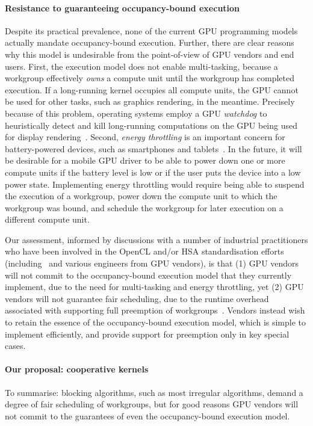 \documentclass[numbers,nocopyrightspace,10pt]{sigplanconf}
\begin{document}
\paragraph{Resistance to guaranteeing occupancy-bound execution}

Despite its practical prevalence, none of the current GPU programming
models actually mandate occupancy-bound execution.  Further, there are
clear reasons why this model is undesirable from the point-of-view of
GPU vendors and end users.  First, the execution model does not enable
multi-tasking, because a workgroup effectively \emph{owns} a compute
unit until the workgroup has completed execution.  If a long-running
kernel occupies all compute units, the GPU cannot be used for other
tasks, such as graphics rendering, in the meantime.  Precisely because
of this problem, operating systems employ a GPU \emph{watchdog} to
heuristically detect and kill long-running computations on the GPU
being used for display rendering~\cite{DBLP:conf/iwocl/SorensenD16}.  Second, \emph{energy throttling} is
an important concern for battery-powered devices, such as smartphones
and tablets~\cite{DBLP:journals/comsur/Vallina-RodriguezC13}.  In the future, it will be desirable for a mobile GPU driver to be able to
power down one or more compute units if the battery level is low or if
the user puts the device into a low power state.  Implementing energy
throttling would require being able to suspend the execution of a
workgroup, power down the compute unit to which the workgroup was
bound, and schedule the workgroup for later execution on a different
compute unit.

Our assessment, informed by discussions with a number of industrial
practitioners who have been involved in the OpenCL and/or HSA
standardisation efforts
(including~\cite{PersonalCommunicationRichards,PersonalCommunicationHowes}
and various engineers from GPU vendors), is that (1) GPU vendors will
not commit to the occupancy-bound execution model that they currently
implement, due to the need for multi-tasking and energy throttling,
yet (2) GPU vendors will not guarantee fair scheduling, due to the
runtime overhead associated with supporting full preemption of
workgroups~\cite{ISCAPAPERSreeMentioned}.  Vendors instead wish to
retain the essence of the occupancy-bound execution model, which is
simple to implement efficiently, and provide support for preemption
only in key special cases.


\paragraph{Our proposal: cooperative kernels}
%
To summarise: blocking algorithms, such as most irregular algorithms,
demand a degree of fair scheduling of workgroups, but for good reasons
GPU vendors will not commit to the guarantees of even the
occupancy-bound execution model.
\end{document}
